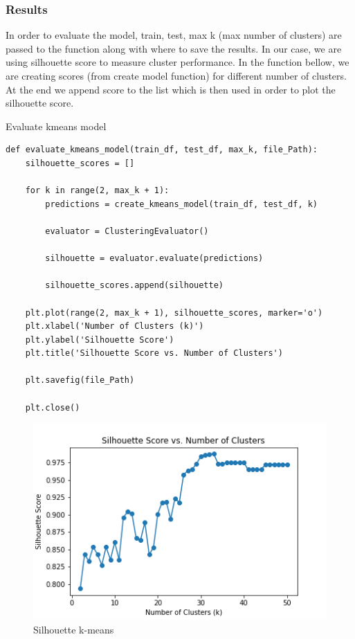 \subsubsection{Results}

In order to evaluate the model, train, test, max k (max number of clusters) are passed to the function along with where to save the results. In our case, we are using silhouette score to measure cluster performance. In the function bellow, we are creating scores (from create model function) for different number of clusters. At the end we append score to the list which is then used in order to plot the silhouette score.
\begin{listing}[H]
\caption{Evaluate kmeans model}
\begin{verbatim}
def evaluate_kmeans_model(train_df, test_df, max_k, file_Path):
    silhouette_scores = []

    for k in range(2, max_k + 1):
        predictions = create_kmeans_model(train_df, test_df, k)

        evaluator = ClusteringEvaluator()

        silhouette = evaluator.evaluate(predictions)

        silhouette_scores.append(silhouette)

    plt.plot(range(2, max_k + 1), silhouette_scores, marker='o')
    plt.xlabel('Number of Clusters (k)')
    plt.ylabel('Silhouette Score')
    plt.title('Silhouette Score vs. Number of Clusters')

    plt.savefig(file_Path)

    plt.close()
\end{verbatim}
\end{listing}

\begin{figure}[H]
    \includegraphics[scale=0.85]{img/Model/Clustering/kmenas.png}
    \centering
    \caption{Silhouette k-means}
    \label{fig:SVM_confusion_matrix}
\end{figure}